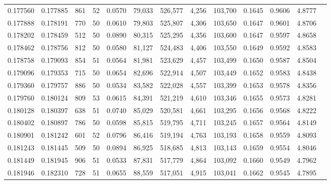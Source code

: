 \begin{tabular}{rrrrrrrrrrrrr}
0.177560 & 0.177885 &   861 &  52 &                                     0.0570 &  79,033 & 526,577 &   4,256 & 103,700 & 0.1645 & 0.9606 & 4.8777 \\
0.177888 & 0.178191 &   770 &  50 &                                     0.0610 &  79,803 & 525,807 &   4,306 & 103,650 & 0.1647 & 0.9601 & 4.8706 \\
0.178202 & 0.178459 &   512 &  50 &                                     0.0890 &  80,315 & 525,295 &   4,356 & 103,600 & 0.1647 & 0.9597 & 4.8658 \\
0.178462 & 0.178756 &   812 &  50 &                                     0.0580 &  81,127 & 524,483 &   4,406 & 103,550 & 0.1649 & 0.9592 & 4.8583 \\
0.178758 & 0.179093 &   854 &  51 &                                     0.0564 &  81,981 & 523,629 &   4,457 & 103,499 & 0.1650 & 0.9587 & 4.8504 \\
0.179096 & 0.179353 &   715 &  50 &                                     0.0654 &  82,696 & 522,914 &   4,507 & 103,449 & 0.1652 & 0.9583 & 4.8438 \\
0.179360 & 0.179757 &   886 &  50 &                                     0.0534 &  83,582 & 522,028 &   4,557 & 103,399 & 0.1653 & 0.9578 & 4.8356 \\
0.179760 & 0.180124 &   809 &  53 &                                     0.0615 &  84,391 & 521,219 &   4,610 & 103,346 & 0.1655 & 0.9573 & 4.8281 \\
0.180128 & 0.180397 &   638 &  51 &                                     0.0740 &  85,029 & 520,581 &   4,661 & 103,295 & 0.1656 & 0.9568 & 4.8222 \\
0.180402 & 0.180897 &   786 &  50 &                                     0.0598 &  85,815 & 519,795 &   4,711 & 103,245 & 0.1657 & 0.9564 & 4.8149 \\
0.180901 & 0.181242 &   601 &  52 &                                     0.0796 &  86,416 & 519,194 &   4,763 & 103,193 & 0.1658 & 0.9559 & 4.8093 \\
0.181243 & 0.181445 &   509 &  50 &                                     0.0894 &  86,925 & 518,685 &   4,813 & 103,143 & 0.1659 & 0.9554 & 4.8046 \\
0.181449 & 0.181945 &   906 &  51 &                                     0.0533 &  87,831 & 517,779 &   4,864 & 103,092 & 0.1660 & 0.9549 & 4.7962 \\
0.181946 & 0.182310 &   728 &  51 &                                     0.0655 &  88,559 & 517,051 &   4,915 & 103,041 & 0.1662 & 0.9545 & 4.7895 \\

\end{tabular}
